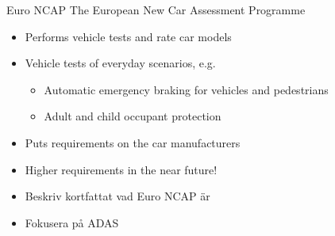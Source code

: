 \documentclass{beamer}
\newcommand{\eg}{e.g.\xspace}
\renewcommand{\a}{\r{a}\xspace}
\renewcommand{\aa}{\"a\xspace}
\begin{document}
\begin{frame}{Euro NCAP}
	The European New Car Assessment Programme
	\begin{itemize}
		\item Performs vehicle tests and rate car models
		\item Vehicle tests of everyday scenarios, \eg
		\begin{itemize}
			\item Automatic emergency braking for vehicles and pedestrians
			\item Adult and child occupant protection
		\end{itemize}
		\item Puts requirements on the car manufacturers
		\item Higher requirements in the near future!
	\end{itemize}

	\note
	{
		\begin{itemize}
			\item Beskriv kortfattat vad Euro NCAP \aa{}r
			\item Fokusera p\a{} ADAS
		\end{itemize}
	}
\end{frame}
\end{document}
